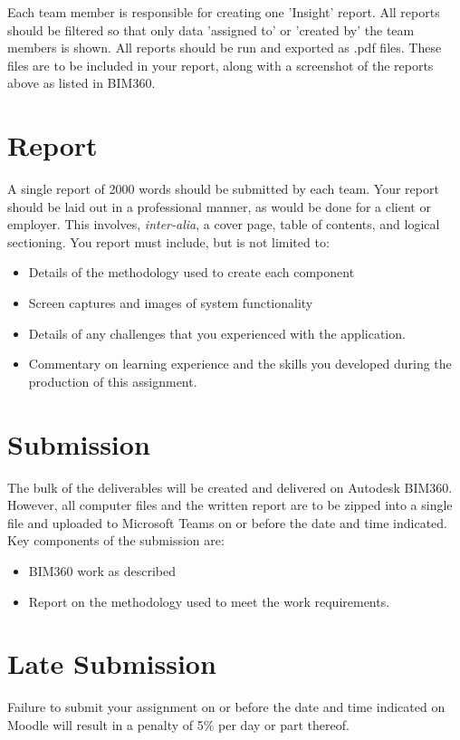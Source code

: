 Each team member is responsible for creating one 'Insight' report.  All reports should be filtered so that only data 'assigned to' or 'created by' the team members is shown.  All reports should be run and exported as .pdf files.  These files are to be included in your report, along with a screenshot of the reports above as listed in BIM360.\\



\newpage
\section*{Report}
A single report of 2000 words should be submitted by each team.  Your report should be laid out in a professional manner, as would be done for a client or employer.  This involves, \emph{inter-alia}, a cover page, table of contents, and logical sectioning.  You report must include, but is not limited to:
\begin{itemize}
	\item Details of the methodology used to create each component
	\item Screen captures and images of system functionality
	\item Details of any challenges that you experienced with the application.
	\item Commentary on learning experience and the skills you developed during the production of this assignment.
\end{itemize}



\section*{Submission}
The bulk of the deliverables will be created and delivered on Autodesk BIM360.  However, all computer files and the written report are to be zipped into a single file and uploaded to Microsoft Teams on or before the date and time indicated.  Key components of the submission are:

\begin{itemize}
	\item BIM360 work as described
	\item Report on the methodology used to meet the work requirements.  
\end{itemize}



\section*{Late Submission}
Failure to submit your assignment on or before the date and time indicated on Moodle will result in a penalty of 5\% per day or part thereof.

